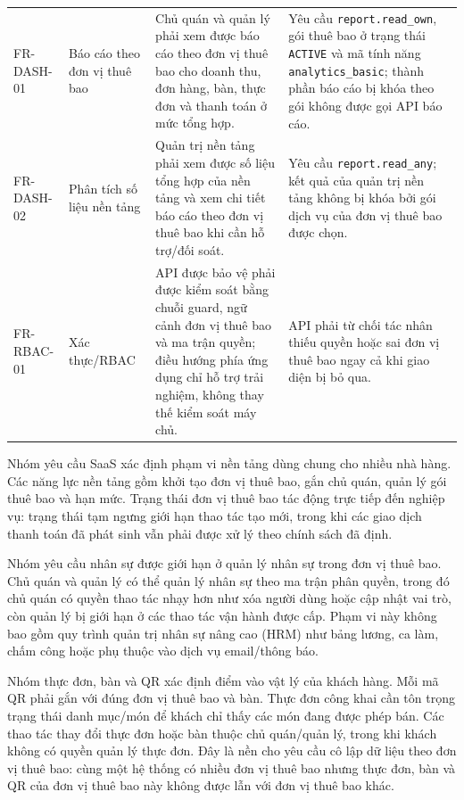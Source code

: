\begin{longtable}{@{}>{\raggedright\arraybackslash}p{}>{\raggedright\arraybackslash}p{}>{\raggedright\arraybackslash}p{}>{\raggedright\arraybackslash}p{}@{}}
\addlinespace
FR-DASH-01 & Báo cáo theo đơn vị thuê bao & Chủ quán và quản lý phải xem được báo cáo theo đơn vị thuê bao cho doanh thu, đơn hàng, bàn, thực đơn và thanh toán ở mức tổng hợp. & Yêu cầu {\scriptsize\texttt{report.read\_own}}, gói thuê bao ở trạng thái {\scriptsize\texttt{ACTIVE}} và mã tính năng {\scriptsize\texttt{analytics\_basic}}; thành phần báo cáo bị khóa theo gói không được gọi API báo cáo. \\
\addlinespace
FR-DASH-02 & Phân tích số liệu nền tảng & Quản trị nền tảng phải xem được số liệu tổng hợp của nền tảng và xem chi tiết báo cáo theo đơn vị thuê bao khi cần hỗ trợ/đối soát. & Yêu cầu {\scriptsize\texttt{report.read\_any}}; kết quả của quản trị nền tảng không bị khóa bởi gói dịch vụ của đơn vị thuê bao được chọn. \\
\addlinespace
FR-RBAC-01 & Xác thực/RBAC & API được bảo vệ phải được kiểm soát bằng chuỗi guard, ngữ cảnh đơn vị thuê bao và ma trận quyền; điều hướng phía ứng dụng chỉ hỗ trợ trải nghiệm, không thay thế kiểm soát máy chủ. & API phải từ chối tác nhân thiếu quyền hoặc sai đơn vị thuê bao ngay cả khi giao diện bị bỏ qua. \\
\bottomrule
\end{longtable}

Nhóm yêu cầu SaaS xác định phạm vi nền tảng dùng chung cho nhiều nhà hàng. Các năng lực nền tảng gồm khởi tạo đơn vị thuê bao, gắn chủ quán, quản lý gói thuê bao và hạn mức. Trạng thái đơn vị thuê bao tác động trực tiếp đến nghiệp vụ: trạng thái tạm ngưng giới hạn thao tác tạo mới, trong khi các giao dịch thanh toán đã phát sinh vẫn phải được xử lý theo chính sách đã định.

Nhóm yêu cầu nhân sự được giới hạn ở quản lý nhân sự trong đơn vị thuê bao. Chủ quán và quản lý có thể quản lý nhân sự theo ma trận phân quyền, trong đó chủ quán có quyền thao tác nhạy hơn như xóa người dùng hoặc cập nhật vai trò, còn quản lý bị giới hạn ở các thao tác vận hành được cấp. Phạm vi này không bao gồm quy trình quản trị nhân sự nâng cao (HRM) như bảng lương, ca làm, chấm công hoặc phụ thuộc vào dịch vụ email/thông báo.

Nhóm thực đơn, bàn và QR xác định điểm vào vật lý của khách hàng. Mỗi mã QR phải gắn với đúng đơn vị thuê bao và bàn. Thực đơn công khai cần tôn trọng trạng thái danh mục/món để khách chỉ thấy các món đang được phép bán. Các thao tác thay đổi thực đơn hoặc bàn thuộc chủ quán/quản lý, trong khi khách không có quyền quản lý thực đơn. Đây là nền cho yêu cầu cô lập dữ liệu theo đơn vị thuê bao: cùng một hệ thống có nhiều đơn vị thuê bao nhưng thực đơn, bàn và QR của đơn vị thuê bao này không được lẫn với đơn vị thuê bao khác.

